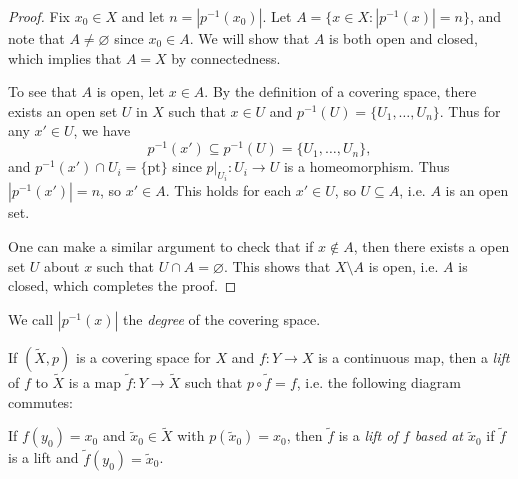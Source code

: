 \begin{proof}
  Fix $x_0 \in X$ and let $n = |p^{-1}(x_0)|$. Let
  $A = \{x \in X : |p^{-1}(x)| = n\}$, and note that
  $A \ne \varnothing$ since $x_0 \in A$. We will
  show that $A$ is both open and closed, which
  implies that $A = X$ by connectedness.

  To see that $A$ is open, let $x \in A$.
  By the definition of a covering space, there exists
  an open set $U$ in $X$ such that $x \in U$ and
  $p^{-1}(U) = \{U_1, \dots, U_n\}$. Thus for
  any $x' \in U$, we have
  \[p^{-1}(x') \subseteq p^{-1}(U) = \{U_1, \dots, U_n\},\]
  and $p^{-1}(x') \cap U_i = \{\text{pt}\}$ since
  $p|_{U_i} : U_i \to U$ is a homeomorphism.
  Thus $|p^{-1}(x')| = n$, so $x' \in A$. This holds
  for each $x' \in U$, so $U \subseteq A$, i.e. $A$
  is an open set.

  One can make a similar argument to check that
  if $x \notin A$, then there exists a open set $U$ about
  $x$ such that $U \cap A = \varnothing$.
  This shows that $X \setminus A$ is open, i.e.
  $A$ is closed, which completes the proof.
\end{proof}

\begin{definition}
  We call $|p^{-1}(x)|$ the \emph{degree} of the
  covering space.
\end{definition}

\begin{definition}
  If $(\widetilde{X}, p)$ is a covering space
  for $X$ and $f : Y \to X$ is a continuous map,
  then a \emph{lift} of $f$ to $\widetilde{X}$ is
  a map $\widetilde{f} : Y \to \widetilde{X}$
  such that $p \circ \widetilde{f} = f$, i.e.
  the following diagram commutes:
  \begin{center}
  \end{center}
  If $f(y_0) = x_0$ and $\widetilde{x}_0 \in \widetilde{X}$
  with $p(\widetilde{x}_0) = x_0$, then
  $\widetilde{f}$ is a \emph{lift of $f$ based at
  $\widetilde{x}_0$} if $\widetilde{f}$ is a lift
  and $\widetilde{f}(y_0) = \widetilde{x}_0$.
\end{definition}

